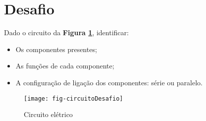 \section{Desafio}

\begin{minipage}{\linewidth}
  \centering
  \begin{minipage}{0.45\linewidth}
    Dado o circuito da \textbf{Figura \ref{fig:CircuitoDesafio}}, identificar:
    \begin{itemize}
      \item Os componentes presentes;
      \item As funções de cada componente;
      \item A configuração de ligação dos componentes: série ou paralelo.
    \end{itemize}
  \end{minipage}
  \hspace{0.05\linewidth}
  \begin{minipage}{0.45\linewidth}
    \begin{figure}[H]
      \centering
      \caption{Circuito elétrico}
      \label{fig:CircuitoDesafio}
      \texttt{[image: fig-circuitoDesafio]}
%
    \end{figure}
  \end{minipage}
\end{minipage}
